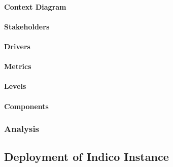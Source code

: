 \paragraph{Context Diagram}
\paragraph{Stakeholders}
\paragraph{Drivers}
\paragraph{Metrics}
\paragraph{Levels}
\paragraph{Components}

\subsubsection{Analysis}

\subsection{Deployment of Indico Instance}
